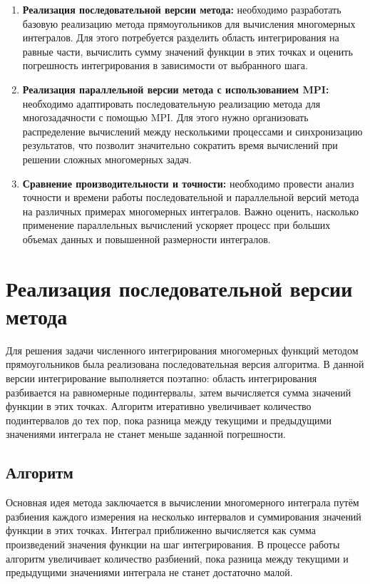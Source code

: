 \documentclass[12pt]{article}
\begin{document}
\begin{enumerate}
\item \textbf{Реализация последовательной версии метода:} необходимо разработать базовую реализацию метода прямоугольников для вычисления многомерных интегралов. Для этого потребуется разделить область интегрирования на равные части, вычислить сумму значений функции в этих точках и оценить погрешность интегрирования в зависимости от выбранного шага.
\item \textbf{Реализация параллельной версии метода с использованием MPI:} необходимо адаптировать последовательную реализацию метода для многозадачности с помощью MPI. Для этого нужно организовать распределение вычислений между несколькими процессами и синхронизацию результатов, что позволит значительно сократить время вычислений при решении сложных многомерных задач.
\item \textbf{Сравнение производительности и точности:} необходимо провести анализ точности и времени работы последовательной и параллельной версий метода на различных примерах многомерных интегралов. Важно оценить, насколько применение параллельных вычислений ускоряет процесс при больших объемах данных и повышенной размерности интегралов.
\end{enumerate}

\newpage
\section*{Реализация последовательной версии метода}

Для решения задачи численного интегрирования многомерных функций методом прямоугольников была реализована последовательная версия алгоритма. В данной версии интегрирование выполняется поэтапно: область интегрирования разбивается на равномерные подинтервалы, затем вычисляется сумма значений функции в этих точках. Алгоритм итеративно увеличивает количество подинтервалов до тех пор, пока разница между текущими и предыдущими значениями интеграла не станет меньше заданной погрешности.

\subsection*{Алгоритм}

Основная идея метода заключается в вычислении многомерного интеграла путём разбиения каждого измерения на несколько интервалов и суммирования значений функции в этих точках. Интеграл приближенно вычисляется как сумма произведений значения функции на шаг интегрирования. В процессе работы алгоритм увеличивает количество разбиений, пока разница между текущими и предыдущими значениями интеграла не станет достаточно малой.
\end{document}
